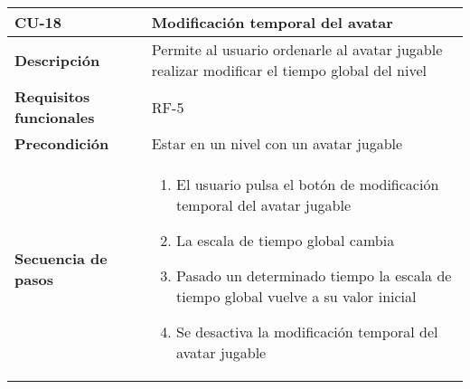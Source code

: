 \begin{longtable}{l|l}
\begin{minipage}{0.25\columnwidth}
\textbf{CU-18} 
\end{minipage}
&
\begin{minipage}{0.65\columnwidth}
Modificación temporal del avatar
\end{minipage}
\\ \hline

\begin{minipage}{0.25\columnwidth}
\textbf{Descripción} 
\end{minipage}
&
\begin{minipage}{0.65\columnwidth}
Permite al usuario ordenarle al avatar jugable realizar modificar el tiempo global del nivel
\end{minipage}
\\ \hline

\begin{minipage}{0.25\columnwidth}
\textbf{Requisitos funcionales} 
\end{minipage}
&
\begin{minipage}{0.65\columnwidth}
RF-5
\end{minipage}
\\ \hline

\begin{minipage}{0.25\columnwidth}
\textbf{Precondición} 
\end{minipage}
&
\begin{minipage}{0.65\columnwidth}
Estar en un nivel con un avatar jugable
\end{minipage}
\\ \hline

\begin{minipage}{0.25\columnwidth}
\textbf{Secuencia de pasos} 
\end{minipage}
&
\begin{minipage}{0.65\columnwidth}
\begin{enumerate}
\item
El usuario pulsa el botón de modificación temporal del avatar jugable
\item
La escala de tiempo global cambia
\item
Pasado un determinado tiempo la escala de tiempo global vuelve a su valor inicial
\item
Se desactiva la modificación temporal del avatar jugable
\end{enumerate}
\end{minipage}
\\ \hline


\end{longtable}
